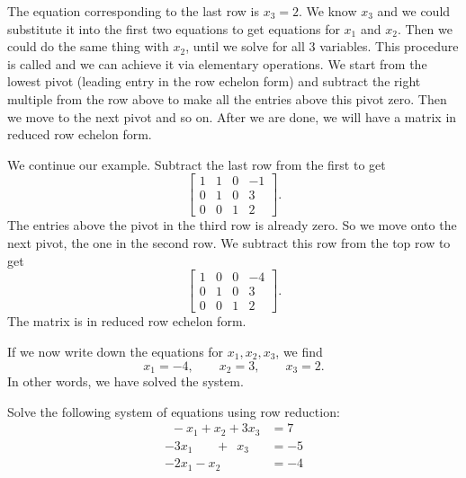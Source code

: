 \documentclass{ximera}
\begin{document}
The equation corresponding to the last row is $x_3 = 2$. We know $x_3$ and we could substitute it into the first two equations to get equations for $x_1$ and $x_2$.  Then we could do the same thing with $x_2$, until we solve for all 3 variables.  This procedure is called \emph{} and we can achieve it via elementary operations. We start from the lowest pivot (leading entry in the row echelon form) and subtract the right multiple from the row above to make all the entries above this pivot zero. Then we move to the next pivot and so on. After we are done, we will have a matrix in reduced row echelon form.

We continue our example. Subtract the last row from the first to get
\begin{equation*}
    \left[
        \begin{array}{ccc|c}
            1 & 1 & 0 & -1 \\
            0 & 1 & 0 & 3 \\
            0 & 0 & 1 & 2 
        \end{array}
    \right] .
\end{equation*}
The entries above the pivot in the third row is already zero. So we move onto the next pivot, the one in the second row.  We subtract this row from the top row to get
\begin{equation*}
    \left[
        \begin{array}{ccc|c}
            1 & 0 & 0 & -4 \\
            0 & 1 & 0 & 3 \\
            0 & 0 & 1 & 2 
        \end{array}
    \right] .
\end{equation*}
The matrix is in reduced row echelon form.

If we now write down the equations for $x_1,x_2,x_3$, we find
\begin{equation*}
    x_1 = -4, \qquad x_2 = 3, \qquad x_3 = 2 .
\end{equation*}
In other words, we have solved the system.

\begin{example}
    Solve the following system of equations using row reduction:
    \begin{equation*}
        \begin{split}
            \phantom{9} -x_1 + x_2 + 3x_3 &= 7 \\
            -3x_1 \phantom{+x_2} + \phantom{9} x_3 &= -5 \\
            -2x_1 - x_2 &= -4
        \end{split}
    \end{equation*}
\end{example}
\end{document}
